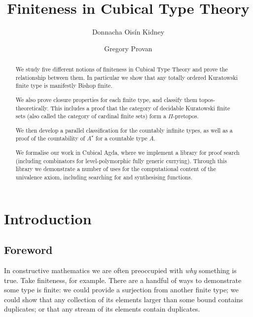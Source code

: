 
\title{Finiteness in Cubical Type Theory}
\author{
  Donnacha Oisín Kidney  \and
  Gregory Provan 
}

\maketitle
\begin{abstract}
  We study five different notions of finiteness in Cubical Type Theory and prove
  the relationship between them.
  In particular we show that any totally ordered Kuratowski finite type is
  manifestly Bishop finite.

  We also prove closure properties for each finite type, and classify them
  topos-theoretically.
  This includes a proof that the category of decidable Kuratowski finite sets
  (also called the category of cardinal finite sets) form a \(\Pi\)-pretopos.

  We then develop a parallel classification for the countably infinite types, as
  well as a proof of the countability of \(A^\star\) for a countable type \(A\).

  We formalise our work in Cubical Agda, where we implement a library for proof
  search (including combinators for level-polymorphic fully generic currying).
  Through this library we demonstrate a number of uses for the computational
  content of the univalence axiom, including searching for and synthesising
  functions.
\end{abstract}

\section{Introduction}
\subsection{Foreword}
In constructive mathematics we are often preoccupied with \emph{why} something
is true.
Take finiteness, for example.
There are a handful of ways to demonstrate some type is finite: we could provide
a surjection from another finite type; we could show that any collection of its
elements larger than some bound contains duplicates; or that any stream of its
elements contain duplicates.

